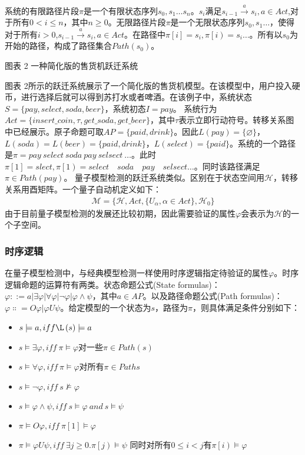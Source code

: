 系统的有限路径片段\(\pi\)是一个有限状态序列\(s_0,s_1\ldots s_n\)。\(s_i\)满足\(s_{i-1}\overset{a}{\rightarrow}s_i,a\in Act\),对于所有\(0<i\leq n\)，其中\(n\geq 0 \)。无限路径片段\(\pi\)是一个无限状态序列\(s_0,s_1\ldots\)，使得对于所有\(i>0\),\(s_{i-1} \overset{a}{\rightarrow}  s_i,a\in Act\)。在路径中\(\pi\left[i\right]=s_i,\pi\left[i\right)=s_i\ldots\)。所有以\(s_0\)为开始的路径，构成了路径集合\(Path\left(s_0\right)\)。
 
图表 2 一种简化版的售货机跃迁系统

图表 2所示的跃迁系统展示了一个简化版的售货机模型。在该模型中，用户投入硬币，进行选择后就可以得到苏打水或者啤酒。在该例子中，系统状态\(S=\{pay,select,soda,beer\}\)，系统初态\(I=pay\)。
系统行为\(Act=\{insert\_coin,\tau,get\_soda,get\_beer\}\)，其中\(\tau\)表示立即行动符号。转移关系图中已经展示。原子命题可取\(AP=\{paid,drink\}\)。因此\(L\left( pay \right)=\{\varnothing\}\)，\(L\left(soda\right)=L\left(beer\right)=\{paid,drink\}\)，\(L\left(select\right)=\{paid\}\)。系统的一个路径是\(\pi=pay\ select\ soda\ pay\ selsect\ \ldots\)。此时\(\pi\left[1\right]=slect,\pi\left[1\right)=select\quad soda\quad pay\quad selsect\ldots\)。同时该路径满足\(\pi\in Path\left(pay\right)\)。
量子模型检测的跃迁系统类似。区别在于状态空间用\(\mathcal{H}\)，转移关系用酉矩阵。一个量子自动机定义如下：
\begin{align}
    \mathcal{M}=\{\mathcal{H},Act,\{U_\alpha,\alpha\in Act\},\mathcal{H}_0\}
\end{align}
由于目前量子模型检测的发展还比较初期，因此需要验证的属性\(\varphi\)会表示为\(\mathcal{H}\)的一个子空间。
\subsubsection{时序逻辑}
在量子模型检测中，与经典模型检测一样使用时序逻辑指定待验证的属性\(\varphi\)。时序逻辑命题的运算符有两类\citep{goranko_2023}。状态命题公式(State formulas)：\(\varphi ::=a\left|\exists\varphi\right|\forall \varphi\left|\lnot\varphi\right|\varphi\land\psi\)，其中\(a\in AP\)。以及路径命题公式(Path formulas)：\(\varphi\Colon=O\varphi|\varphi U\psi\)。给定模型的一个状态为\(s\)，路径为\(\pi\)，则具体满足条件分别如下：
\begin{itemize}
    \item \(s\models a,iff \L\left(s\right)\models a\)
    \item \(s\models\exists\varphi,iff\ \pi\models\varphi\)对一些\(\pi\in Path\left(s\right)\)
    \item \(s\models\forall\varphi,iff\ \pi\models\varphi\)对所有\(π\in Paths\)
    \item \(s\models\lnot\varphi,iff\ s\nvDash\varphi\)
    \item \(s\models\varphi\land\psi,iff\ s\models\varphi\ and\ s\models\psi\)
    \item \(\pi\models O\varphi,iff\ \pi\left[1\right]\models\varphi\)
    \item \(\pi\models\varphi U\psi,iff\ \exists j\geq0\).\(\pi\left[j\right)\models\psi\) 同时对所有\(0\le i<j\)有\(\pi\left[i\right)\models\varphi\)
\end{itemize}

